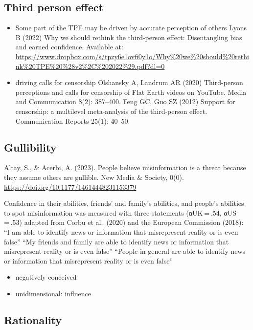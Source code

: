 \documentclass[
  ,jou,floatsintext]{apa6}
\providecommand{\tightlist}{%
  \setlength{\itemsep}{0pt}\setlength{\parskip}{0pt}}
\begin{document}
\hypertarget{third-person-effect}{%
\subsection{Third person effect}\label{third-person-effect}}

\begin{itemize}
\item
  Some part of the TPE may be driven by accurate perception of others
  Lyons B (2022) Why we should rethink the third-person effect: Disentangling bias and earned confidence. Available at: \url{https://www.dropbox.com/s/tpzy6e1ovfi0y1o/Why\%20we\%20should\%20rethink\%20TPE\%20\%28v2\%2C\%202022\%29.pdf?dl=0}
\item
  driving calls for censorship
  Olshansky A, Landrum AR (2020) Third-person perceptions and calls for censorship of Flat Earth videos on YouTube. Media and Communication 8(2): 387--400.
  Feng GC, Guo SZ (2012) Support for censorship: a multilevel meta-analysis of the third-person effect. Communication Reports 25(1): 40--50.
\end{itemize}

\hypertarget{gullibility}{%
\subsection{Gullibility}\label{gullibility}}

Altay, S., \& Acerbi, A. (2023). People believe misinformation is a threat because they assume others are gullible. New Media \& Society, 0(0). \url{https://doi.org/10.1177/14614448231153379}

Confidence in their abilities, friends' and family's abilities, and people's abilities to spot misinformation was measured with three statements (αUK = .54, αUS = .53) adapted from Corbu et al.~(2020) and the European Commission (2018):
``I am able to identify news or information that misrepresent reality or is even false''
``My friends and family are able to identify news or information that misrepresent reality or is even false''
``People in general are able to identify news or information that misrepresent reality or is even false''

\begin{itemize}
\tightlist
\item
  negatively conceived
\item
  unidimensional: influence
\end{itemize}

\hypertarget{rationality}{%
\subsection{Rationality}\label{rationality}}
\end{document}
